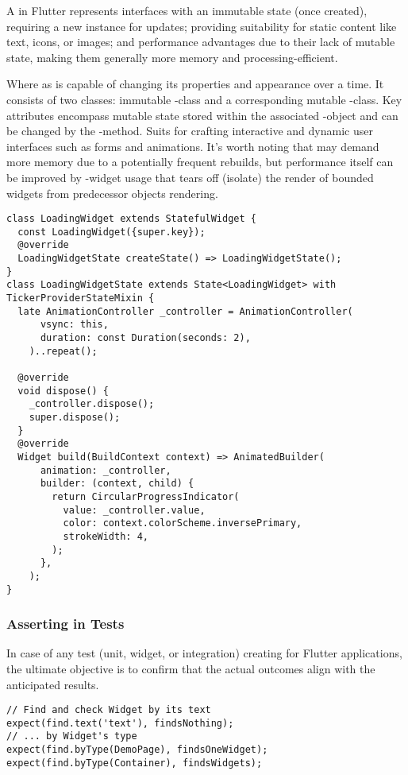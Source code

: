 A  in Flutter represents interfaces with an immutable state (once created), requiring a new instance 
for updates; providing suitability for static content like text, icons, or images; and performance advantages due to 
their lack of mutable state, making them generally more memory and processing-efficient.

Where as  is capable of changing its properties and appearance over a time. It consists of two classes: 
immutable -class and a corresponding mutable -class. Key attributes encompass mutable state stored 
within the associated -object and can be changed by the -method. Suits for crafting interactive 
and dynamic user interfaces such as forms and animations. It's worth noting that  may demand more 
memory due to a potentially frequent rebuilds, but performance itself can be improved by -widget 
usage that tears off (isolate) the render of bounded widgets from predecessor objects rendering.

\begin{lstlisting}
class LoadingWidget extends StatefulWidget {
  const LoadingWidget({super.key});
  @override
  LoadingWidgetState createState() => LoadingWidgetState();
}
class LoadingWidgetState extends State<LoadingWidget> with TickerProviderStateMixin {
  late AnimationController _controller = AnimationController(
      vsync: this,
      duration: const Duration(seconds: 2),
    )..repeat();

  @override
  void dispose() {
    _controller.dispose();
    super.dispose();
  }
  @override
  Widget build(BuildContext context) => AnimatedBuilder(
      animation: _controller,
      builder: (context, child) {
        return CircularProgressIndicator(
          value: _controller.value,
          color: context.colorScheme.inversePrimary,
          strokeWidth: 4,
        );
      },
    );
}
\end{lstlisting}


\newpage
\subsubsection{Asserting in Tests}

In case of any test (unit, widget, or integration) creating for Flutter applications, the ultimate objective is to 
confirm that the actual outcomes align with the anticipated results.

\begin{lstlisting}
// Find and check Widget by its text
expect(find.text('text'), findsNothing);
// ... by Widget's type
expect(find.byType(DemoPage), findsOneWidget);
expect(find.byType(Container), findsWidgets);
\end{lstlisting}

